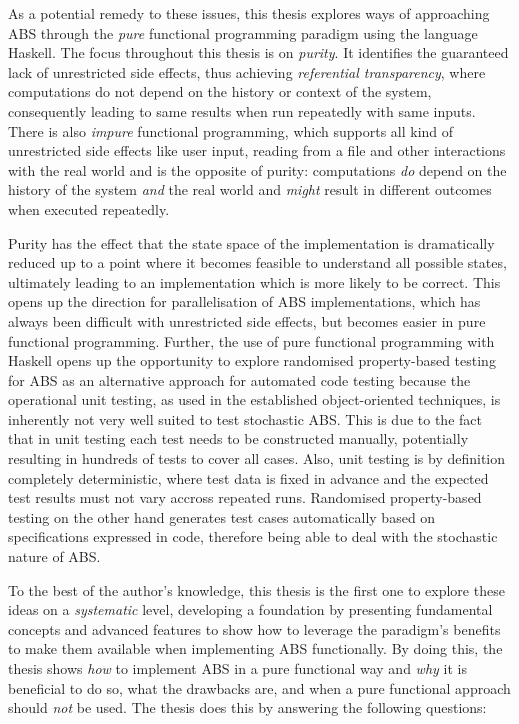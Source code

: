 As a potential remedy to these issues, this thesis explores ways of approaching ABS through the \textit{pure} functional programming paradigm using the language Haskell. The focus throughout this thesis is on \textit{purity}. It identifies the guaranteed lack of unrestricted side effects, thus achieving \textit{referential transparency}, where computations do not depend on the history or context of the system, consequently leading to same results when run repeatedly with same inputs. There is also \textit{impure} functional programming, which supports all kind of unrestricted side effects like user input, reading from a file and other interactions with the real world and is the opposite of purity: computations \textit{do} depend on the history of the system \textit{and} the real world and \textit{might} result in different outcomes when executed repeatedly.

Purity has the effect that the state space of the implementation is dramatically reduced up to a point where it becomes feasible to understand all possible states, ultimately leading to an implementation which is more likely to be correct. This opens up the direction for parallelisation of ABS implementations, which has always been difficult with unrestricted side effects, but becomes easier in pure functional programming. Further, the use of pure functional programming with Haskell opens up the opportunity to explore randomised property-based testing for ABS as an alternative approach for automated code testing because the operational unit testing, as used in the established object-oriented techniques, is inherently not very well suited to test stochastic ABS. This is due to the fact that in unit testing each test needs to be constructed manually, potentially resulting in hundreds of tests to cover all cases. Also, unit testing is by definition completely deterministic, where test data is fixed in advance and the expected test results must not vary accross repeated runs. Randomised property-based  testing on the other hand  generates test cases automatically based on specifications expressed in code, therefore being able to deal with the stochastic nature of ABS.

To the best of the author's knowledge, this thesis is the first one to explore these ideas on a \textit{systematic} level, developing a foundation by presenting fundamental concepts and advanced features to show how to leverage the paradigm's benefits \cite{hudak_history_2007} to make them available when implementing ABS functionally. By doing this, the thesis shows \textit{how} to implement ABS in a pure functional way and \textit{why} it is beneficial to do so, what the drawbacks are, and when a pure functional approach should \textit{not} be used. The thesis does this by answering the following questions:

